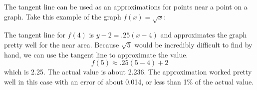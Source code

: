\documentclass[../revisedmain.tex]{subfiles}
\begin{document}
The tangent line can be used as an approximations for points near a point on a graph. Take this example of the graph $f(x)=\sqrt{x}$:
	\begin{center}
		\end{center}
		The tangent line for $f(4)$ is $y-2=.25(x-4)$ and approximates the graph pretty well for the near area. Because $\sqrt{5}$ would be incredibly difficult to find by hand, we can use the tangent line to approximate the value. $$f(5) \approx .25(5-4)+2$$ which is 2.25. The actual value is about 2.236. The approximation worked pretty well in this case with an error of about 0.014, or less than 1\% of the actual value.
\end{document}
